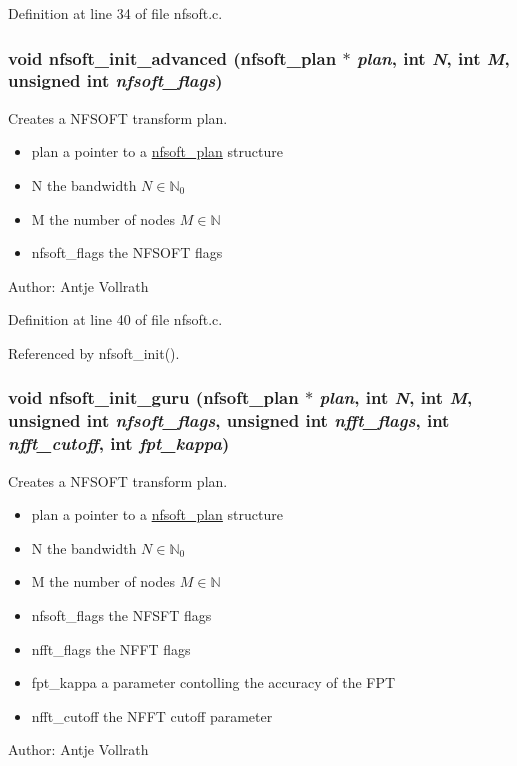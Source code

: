 Definition at line 34 of file nfsoft.c.\hypertarget{group__nfsoft_gf4aec4ee2a2a5d56ca27c4f1a7f90b18}{
\subsubsection{\setlength{\rightskip}{0pt plus 5cm}void nfsoft\_\-init\_\-advanced ({\bf nfsoft\_\-plan} $\ast$ {\em plan}, int {\em N}, int {\em M}, unsigned int {\em nfsoft\_\-flags})}}
\label{group__nfsoft_gf4aec4ee2a2a5d56ca27c4f1a7f90b18}


Creates a NFSOFT transform plan. 

\begin{itemize}
\item plan a pointer to a \hyperlink{structnfsoft__plan}{nfsoft\_\-plan} structure \item N the bandwidth $N \in \mathbb{N}_0$ \item M the number of nodes $M \in \mathbb{N}$ \item nfsoft\_\-flags the NFSOFT flags\end{itemize}
\begin{Desc}
\item[Author:]Antje Vollrath \end{Desc}


Definition at line 40 of file nfsoft.c.

Referenced by nfsoft\_\-init().\hypertarget{group__nfsoft_g1c13cdd3f82f48fa41acdd313cdc2052}{
\subsubsection{\setlength{\rightskip}{0pt plus 5cm}void nfsoft\_\-init\_\-guru ({\bf nfsoft\_\-plan} $\ast$ {\em plan}, int {\em N}, int {\em M}, unsigned int {\em nfsoft\_\-flags}, unsigned int {\em nfft\_\-flags}, int {\em nfft\_\-cutoff}, int {\em fpt\_\-kappa})}}
\label{group__nfsoft_g1c13cdd3f82f48fa41acdd313cdc2052}


Creates a NFSOFT transform plan. 

\begin{itemize}
\item plan a pointer to a \hyperlink{structnfsoft__plan}{nfsoft\_\-plan} structure \item N the bandwidth $N \in \mathbb{N}_0$ \item M the number of nodes $M \in \mathbb{N}$ \item nfsoft\_\-flags the NFSFT flags \item nfft\_\-flags the NFFT flags \item fpt\_\-kappa a parameter contolling the accuracy of the FPT \item nfft\_\-cutoff the NFFT cutoff parameter\end{itemize}
\begin{Desc}
\item[Author:]Antje Vollrath \end{Desc}


